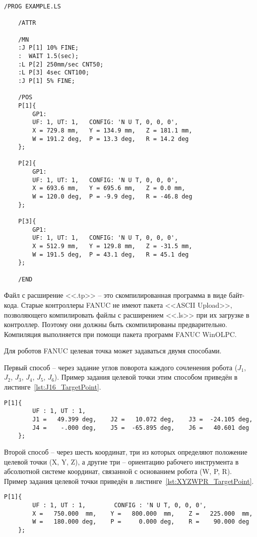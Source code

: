 \begin{lstlisting}[caption={Пример оформления .LS файлов}, label={lst:LS_Example}]
	/PROG EXAMPLE.LS

	/ATTR

	/MN
	:J P[1] 10% FINE;
	:  WAIT 1.5(sec);
	:L P[2] 250mm/sec CNT50;
	:L P[3] 4sec CNT100;
	:J P[1] 5% FINE;

	/POS
	P[1]{
		GP1:
		UF: 1, UT: 1,	CONFIG: 'N U T, 0, 0, 0',
		X = 729.8 mm,	Y = 134.9 mm,	Z = 181.1 mm,
		W = 191.2 deg,	P = 13.3 deg,	R = 14.2 deg
	};

	P[2]{
		GP1:
		UF: 1, UT: 1,	CONFIG: 'N U T, 0, 0, 0',
		X = 693.6 mm,	Y = 695.6 mm,	Z = 0.0 mm,
		W = 120.0 deg,	P = -9.9 deg,	R = -46.8 deg
	};

	P[3]{
		GP1:
		UF: 1, UT: 1,	CONFIG: 'N U T, 0, 0, 0',
		X = 512.9 mm,	Y = 129.8 mm,	Z = -31.5 mm,
		W = 191.5 deg,	P = 43.1 deg,	R = 45.1 deg
	};

	/END
\end{lstlisting}

Файл с расширение <<.tp>> -- это скомпилированная программа в виде байт-кода.
Старые контроллеры FANUC не имеют пакета <<ASCII Upload>>, позволяющего компилировать файлы с расширением <<.ls>> при их загрузке в контроллер.
Поэтому они должны быть скомпилированы предварительно.
Компиляция выполняется при помощи пакета программ FANUC WinOLPC.

Для роботов FANUC целевая точка может задаваться двумя способами.

Первый способ -- через задание углов поворота каждого сочленения робота ($J_1$, $J_2$, $J_3$, $J_4$, $J_5$, $J_6$).
Пример задания целевой точки этим способом приведён в листинге~\ref{lst:J16_TargetPoint}.

\begin{lstlisting}[caption={Задание целевой точки с помощью углов J1-J6}, label={lst:J16_TargetPoint}]
	P[1]{
		UF : 1, UT : 1,
		J1 =   49.399 deg,    J2 =   10.072 deg,    J3 =  -24.105 deg,
		J4 =    -.000 deg,    J5 =  -65.895 deg,    J6 =   40.601 deg
	};
\end{lstlisting}

Второй способ -- через шесть координат, три из которых определяют положение целевой точки (X, Y, Z), а другие три -- ориентацию рабочего инструмента в абсолютной системе координат, связанной с основанием робота (W, P, R).
Пример задания целевой точки приведён в листинге~\ref{lst:XYZWPR_TargetPoint}.

\begin{lstlisting}[caption={Задание целевой точки с помощью координат XYZWPR}, label={lst:XYZWPR_TargetPoint}]
	P[1]{
		UF : 1, UT : 1,        CONFIG : 'N U T, 0, 0, 0',
		X =   750.000  mm,    Y =   800.000  mm,    Z =   225.000  mm,
		W =   180.000 deg,    P =     0.000 deg,    R =    90.000 deg
	};
\end{lstlisting}

